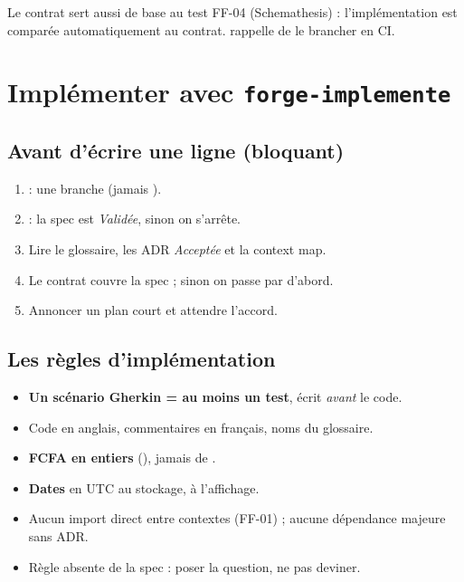 \begin{concept}
Le contrat sert aussi de base au test FF-04 (Schemathesis) : l'implémentation est comparée automatiquement au contrat.
 rappelle de le brancher en CI.
\end{concept}

\section{Implémenter avec \texttt{forge-implemente}}
\subsection*{Avant d'écrire une ligne (bloquant)}
\begin{enumerate}[start=0]
  \item {} : une branche  (jamais ).
  \item {} : la spec est \emph{Validée}, sinon on s'arrête.
  \item Lire le glossaire, les ADR \emph{Acceptée} et la context map.
  \item Le contrat couvre la spec ; sinon on passe par  d'abord.
  \item Annoncer un plan court et attendre l'accord.
\end{enumerate}

\subsection*{Les règles d'implémentation}
\begin{itemize}
  \item \textbf{Un scénario Gherkin = au moins un test}, écrit \emph{avant} le code.
  \item Code en anglais, commentaires en français, noms du glossaire.
  \item \textbf{FCFA en entiers} (), jamais de .
  \item \textbf{Dates} en UTC au stockage,  à l'affichage.
  \item Aucun import direct entre contextes (FF-01) ; aucune dépendance majeure sans ADR.
  \item Règle absente de la spec : poser la question, ne pas deviner.
\end{itemize}

